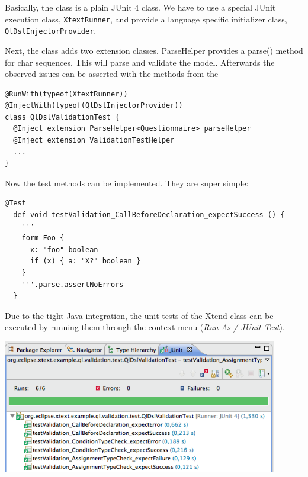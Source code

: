 Basically, the class is a plain JUnit 4 class. We have to use a special
JUnit execution class, \texttt{XtextRunner}, and provide a language specific initializer
class, \texttt{QlDslInjectorProvider}.

Next, the class adds two extension classes. ParseHelper provides a parse()
method for char sequences. This will parse and validate the model. Afterwards
the observed issues can be asserted with the methods from the 

\begin{lstlisting}[language=Xtend]
@RunWith(typeof(XtextRunner))
@InjectWith(typeof(QlDslInjectorProvider))
class QlDslValidationTest { 
  @Inject extension ParseHelper<Questionnaire> parseHelper
  @Inject extension ValidationTestHelper
  ...
}
\end{lstlisting}

Now the test methods can be implemented. They are super simple:

\begin{lstlisting}[language=Xtend]
  @Test
  def void testValidation_CallBeforeDeclaration_expectSuccess () {
    '''
    form Foo {
      x: "foo" boolean
      if (x) { a: "X?" boolean }
    }
    '''.parse.assertNoErrors
  }
\end{lstlisting}
  
Due to the tight Java integration, the unit tests of the Xtend class can be
executed by running them through the context menu (\emph{Run As / JUnit Test}).

\includegraphics[width=12cm]{images/chapter04/validation_4.png}

